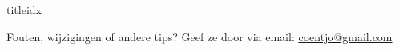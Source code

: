 \documentclass[a4,openany,portrait,tikz]{article}
\begin{document}
\begin{songs}{titleidx}



%	
\end{songs}


Fouten, wijzigingen of andere tips? Geef ze door via email:   \href{mailto:coentjo@gmail.com}{coentjo@gmail.com}
\end{document}
